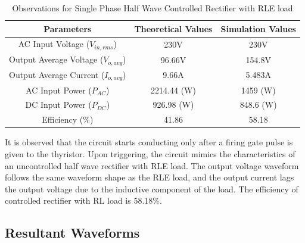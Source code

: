\begin{table}[h]
    \renewcommand{\arraystretch}{1.3}
    \label{table_observation_single-phase-half-wave-controlled-rectifier-with-RLE-load}
    \centering
    \begin{tabular}{|c|c|c|}
        \hline
        Parameters                              & Theoretical Values & Simulation Values \\
        \hline
        \hline
        AC Input Voltage ($ V_{in,rms} $)       & 230V               & 230V              \\
        \hline
        Output Average Voltage ($ V_{o,avg} $)  & 96.66V             & 154.8V            \\
        \hline
        Output Average Current ($ I_{o,avg}  $) & 9.66A              & 5.483A            \\
        \hline
        AC Input Power ($ P_{AC}  $)            & 2214.44 (W)        & 1459 (W)          \\
        \hline
        DC Input Power ($ P_{DC}  $)            & 926.98 (W)         & 848.6 (W)         \\
        \hline
        Efficiency (\%)                         & 41.86              & 58.18             \\
        \hline
    \end{tabular}
    \caption{Observations for Single Phase Half Wave Controlled Rectifier with RLE load}

\end{table}


It is observed that the circuit starts conducting only after a firing gate pulse is given to the thyristor. Upon triggering, the circuit mimics the characteristics of an uncontrolled half wave rectifier with RLE load. The output voltage waveform follows the same waveform shape as the RLE load, and the output current lags the output voltage due to the inductive component of the load.
The efficiency of controlled rectifier with RL load is 58.18\%.





\subsection{Resultant Waveforms}

